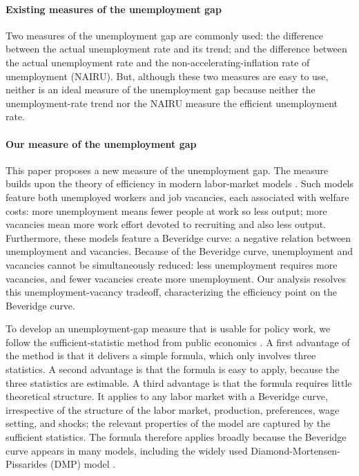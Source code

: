 \documentclass[letterpaper,12pt,leqno]{article}
\begin{document}
\paragraph{Existing measures of the unemployment gap} Two measures of the unemployment gap are commonly used: the difference between the actual unemployment rate and its trend; and the difference between the actual unemployment rate and the non-accelerating-inflation rate of unemployment (NAIRU). But, although these two measures are easy to use, neither is an ideal measure of the unemployment gap because neither the unemployment-rate trend nor the NAIRU measure the efficient unemployment rate.

\paragraph{Our measure of the unemployment gap} This paper proposes a new measure of the unemployment gap. The measure builds upon the theory of efficiency in modern labor-market models . Such models feature both unemployed workers and job vacancies, each associated with welfare costs: more unemployment means fewer people at work so less output; more vacancies mean more work effort devoted to recruiting and also less output. Furthermore, these models feature a Beveridge curve: a negative relation between unemployment and vacancies. Because of the Beveridge curve, unemployment and vacancies cannot be simultaneously reduced: less unemployment requires more vacancies, and fewer vacancies create more unemployment. Our analysis resolves this unemployment-vacancy tradeoff, characterizing the efficiency point on the Beveridge curve.

To develop an unemployment-gap measure that is usable for policy work, we follow the sufficient-statistic method from public economics . A first advantage of the method is that it delivers a simple formula, which only involves three statistics. A second advantage is that the formula is easy to apply, because the three statistics are estimable. A third advantage is that the formula requires little theoretical structure. It applies to any labor market with a Beveridge curve, irrespective of the structure of the labor market, production, preferences, wage setting, and shocks; the relevant properties of the model are captured by the sufficient statistics. The formula therefore applies broadly because the Beveridge curve appears in many models, including the widely used Diamond-Mortensen-Pissarides (DMP) model .
\end{document}
